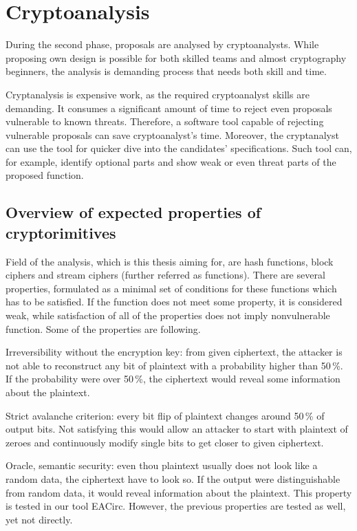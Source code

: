 \documentclass[
  print, %
  Table,   %
  nolof,     %
  nolot,     %
  11pt, %
  oneside  %
]{fithesis3}
\begin{document}
\section{Cryptoanalysis}
\label{sec:cryptoanalysis}

During the second phase, proposals are analysed by cryptoanalysts. While proposing own design is possible for both skilled teams and almost cryptography beginners, the analysis is demanding process that needs both skill and time.

Cryptanalysis is expensive work, as the required cryptoanalyst skills are demanding. It consumes a significant amount of time to reject even proposals vulnerable to known threats. Therefore, a software tool capable of rejecting vulnerable proposals can save cryptoanalyst's time. Moreover, the cryptanalyst can use the tool for quicker dive into the candidates' specifications. Such tool can, for example, identify optional parts and show weak or even threat parts of the proposed function.

\subsection[Cryptorimitives properties]{Overview of expected properties of cryptorimitives}
\label{subsec:crypto-prop}

Field of the analysis, which is this thesis aiming for, are hash functions, block ciphers and stream ciphers (further referred as functions). There are several properties, formulated as a minimal set of conditions for these functions which has to be satisfied. If the function does not meet some property, it is considered weak, while satisfaction of all of the properties does not imply nonvulnerable function. Some of the properties are following.

Irreversibility without the encryption key: from given ciphertext, the attacker is not able to reconstruct any bit of plaintext with a probability higher than 50\,\%. If the probability were over 50\,\%, the ciphertext would reveal some information about the plaintext.

Strict avalanche criterion: every bit flip of plaintext changes around 50\,\% of output bits. Not satisfying this would allow an attacker to start with plaintext of zeroes and continuously modify single bits to get closer to given ciphertext.

Oracle, semantic security: even thou plaintext usually does not look like a random data, the ciphertext have to look so. If the output were distinguishable from random data, it would reveal information about the plaintext. This property is tested in our tool EACirc. However, the previous properties are tested as well, yet not directly.
\end{document}
